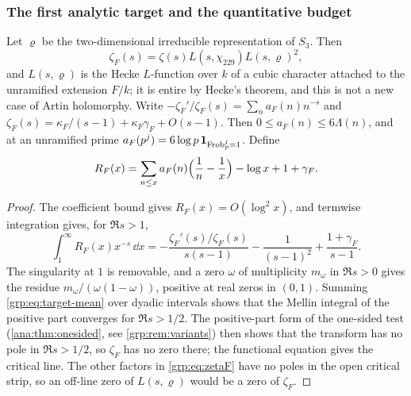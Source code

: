 \subsubsection{The first analytic target and the quantitative budget}
Let $\varrho$ be the two-dimensional irreducible representation of $S_3$. Then
\begin{equation}\label{grp:eq:zetaF}
 \zeta_F(s)=\zeta(s)L(s,\chi_{229})L(s,\varrho)^2,
\end{equation}
and $L(s,\varrho)$ is the Hecke $L$-function over $k$ of a cubic character
attached to the unramified extension $F/k$; it is entire by Hecke's theorem,
and this is not a new case of Artin holomorphy. Write
$-\zeta_F'/\zeta_F(s)=\sum_na_F(n)n^{-s}$ and
$\zeta_F(s)=\kappa_F/(s-1)+\kappa_F\gamma_F+O(s-1)$. Then
$0\le a_F(n)\le6\Lambda(n)$, and at an unramified prime
$a_F(p^j)=6\log p\,\mathbf{1}_{\operatorname{Frob}_p^j=1}$. Define
\begin{equation}\label{grp:eq:targetR}
 R_F(x)=\sum_{n\le x}a_F(n)\Bigl(\frac1n-\frac1x\Bigr)-\log x+1+\gamma_F .
\end{equation}


\begin{proof}
The coefficient bound gives $R_F(x)=O(\log^2x)$, and termwise integration
gives, for $\Re s>1$,
\[
 \int_1^\infty R_F(x)x^{-s}\,\dd x
 =-\frac{\zeta_F'(s)/\zeta_F(s)}{s(s-1)}-\frac1{(s-1)^2}+\frac{1+\gamma_F}{s-1}.
\]
The singularity at $1$ is removable, and a zero $\omega$ of multiplicity
$m_\omega$ in $\Re s>0$ gives the residue $m_\omega/(\omega(1-\omega))$,
positive at real zeros in $(0,1)$. Summing \eqref{grp:eq:target-mean} over
dyadic intervals shows that the Mellin integral of the positive part converges
for $\Re s>1/2$. The positive-part form of the one-sided test
(\cref{ana:thm:onesided}, see \cref{grp:rem:variants}) then shows that the
transform has no pole in $\Re s>1/2$, so $\zeta_F$ has no zero there; the
functional equation gives the critical line. The other factors in
\eqref{grp:eq:zetaF} have no poles in the open critical strip, so an off-line
zero of $L(s,\varrho)$ would be a zero of $\zeta_F$.
\end{proof}

